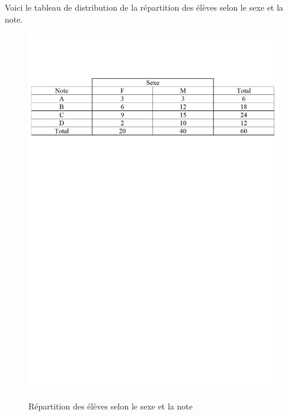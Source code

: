 \documentclass[12pt]{exam}
\theoremstyle{definition}       %
\begin{document}
\begin{questions}
\bigskip

\question Voici le tableau de distribution de la répartition des élèves selon le sexe et la note.

\vspace{-0.4cm}
\begin{figure}[h]
  \begin{center}
  \hspace*{-0.5cm}
  \caption{Répartition des élèves selon le sexe et la note}
  \vspace{-2cm}
    \includegraphics[width=14cm]{New579.pdf}
    \vspace{-14.3cm}
    \label{fig:New579}
  \end{center}
\end{figure}

\end{questions}
\end{document}

